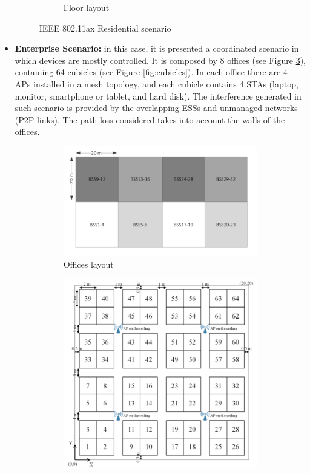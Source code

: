 \documentclass[12pt, a4paper,twoside]{tesi_upf}
\begin{document}
\begin{itemize}
\begin{figure}[h!]
\begin{subfigure}[b]{0.4\textwidth}
					\caption{Floor layout}
					\label{fig:floor}
				\end{subfigure}		
				\caption{IEEE 802.11ax Residential scenario}
				\label{fig:ax_residential_scenario}
			\end{figure}			
			\item \textbf{Enterprise Scenario:} in this case, it is presented a coordinated scenario in which devices are mostly controlled. It is composed by 8 offices (see Figure \ref{fig:offices}), containing 64 cubicles (see Figure \ref{fig:cubicles}). In each office there are 4 APs installed in a mesh topology, and each cubicle contains 4 STAs (laptop, monitor, smartphone or tablet, and hard disk). The interference generated in such scenario is provided by the overlapping ESSs and unmanaged networks (P2P links). The path-loss considered takes into account the walls of the offices.
			\begin{figure}[t!]
				\centering
				\begin{subfigure}[b]{0.4\textwidth}
					\includegraphics[width=\textwidth]{images/enterprise_ax_1}
					\caption{Offices layout}
					\label{fig:offices}
				\end{subfigure}
				\begin{subfigure}[b]{0.4\textwidth}
					\includegraphics[width=\textwidth]{images/enterprise_ax_2}

\end{subfigure}
\end{figure}
\end{itemize}
\end{document}

